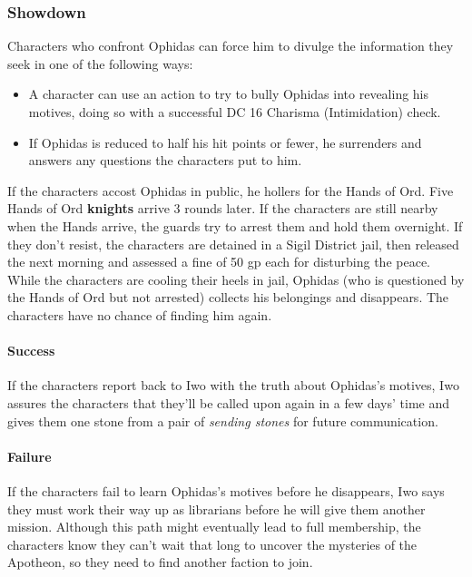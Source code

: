 \documentclass[letterpaper, 11pt, bg=full, twocolumn]{dndbook}
\begin{document}
\subsubsection{Showdown}

Characters who confront Ophidas can force him to divulge the information they seek in one of the following ways:

\begin{itemize}
\item A character can use an action to try to bully Ophidas into revealing his motives, doing so with a successful DC 16 Charisma (Intimidation) check.
\item If Ophidas is reduced to half his hit points or fewer, he surrenders and answers any questions the characters put to him.
\end{itemize}

If the characters accost Ophidas in public, he hollers for the Hands of Ord. Five Hands of Ord \textbf{knights} arrive 3 rounds later. If the characters are still nearby when the Hands arrive, the guards try to arrest them and hold them overnight. If they don't resist, the characters are detained in a Sigil District jail, then released the next morning and assessed a fine of 50 gp each for disturbing the peace. While the characters are cooling their heels in jail, Ophidas (who is questioned by the Hands of Ord but not arrested) collects his belongings and disappears. The characters have no chance of finding him again.

\paragraph{Success}

If the characters report back to Iwo with the truth about Ophidas's motives, Iwo assures the characters that they'll be called upon again in a few days' time and gives them one stone from a pair of \textit{sending stones} for future communication.

\paragraph{Failure}

If the characters fail to learn Ophidas's motives before he disappears, Iwo says they must work their way up as librarians before he will give them another mission. Although this path might eventually lead to full membership, the characters know they can't wait that long to uncover the mysteries of the Apotheon, so they need to find another faction to join.
\end{document}
